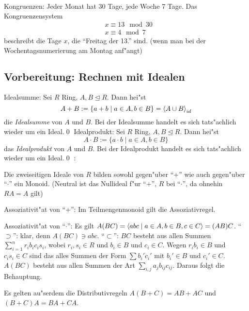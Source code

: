 \example Kongruenzen:{
  Jeder Monat hat 30 Tage, jede Woche 7 Tage. Das Kongruenzensystem
  \begin{align*}
    &x \equiv 13 \mod 30\\
    &x \equiv 4 \mod 7
    \end{align*}
  beschreibt die Tage $x$, die ``Freitag der 13.'' sind. (wenn man bei
  der Wochentagsnumerierung am Montag anf"angt)
  }
\subsection{Vorbereitung: Rechnen mit Idealen}
 Idealsumme:{
  Sei $R$ Ring, $A,B\unlhd R$. Dann hei"st 
  \[A+B:=\{a+b\mid a\in A,b\in B\}={\left\langle A\cup B\right\rangle}_{id}
    \]
  die \emph{Idealsumme} von $A$ und $B$. Bei der Idealsumme handelt 
  es sich tats"achlich wieder um ein Ideal.\qed
  }
 Idealprodukt:{
  Sei $R$ Ring, $A,B\unlhd R$. Dann hei"st 
  \[A\cdot B:=\{a\cdot b\mid a\in A,b\in B\}
    \]
  das \emph{Idealprodukt} von $A$ und $B$. Bei der Idealprodukt handelt 
  es sich tats"achlich wieder um ein Ideal.\qed
  }
\remark:{
  Die zweiseitigen Ideale von $R$ bilden sowohl gegen"uber ``$+$'' wie auch 
  gegen"uber ``$\cdot$'' ein Monoid. 
  (Neutral ist das Nullideal f"ur ``$+$'', $R$ bei ``$\cdot$'', da ohnehin
  $RA=A$ gilt)
  
  Assoziativit"at von ``$+$'': Im Teilmengenmonoid gilt die Assoziativregel.
  
  Assoziativit"at von ``$\cdot$'': Es gilt $A(BC)={\left\langle abc\mid a\in A,b\in B,c\in C\right\rangle}=(AB)C$.
  ``$\supset$'': klar, denn $A(BC)\ni abc$. ``$\subset$'': $BC$ besteht aus allen Summen
  $\sum_{i=1}^n r_ib_ic_is_i$, wobei $r_i,s_i\in R$ und $b_i\in B$ und $c_i\in C$. Wegen
  $r_ib_i\in B$ und $c_is_i\in C$ sind das alles Summen der Form $\sum b_i'c_i'$ mit
  $b_i'\in B$ und $c_i'\in C$.
  $A(BC)$ besteht aus allen Summen der Art $\sum_{i,j} a_jb_{ij}c_{ij}$. Daraus
  folgt die Behauptung.
  
  Es gelten au"serdem die Distributivregeln $A(B+C)=AB+AC$ und $(B+C)A=BA+CA$.
  }
